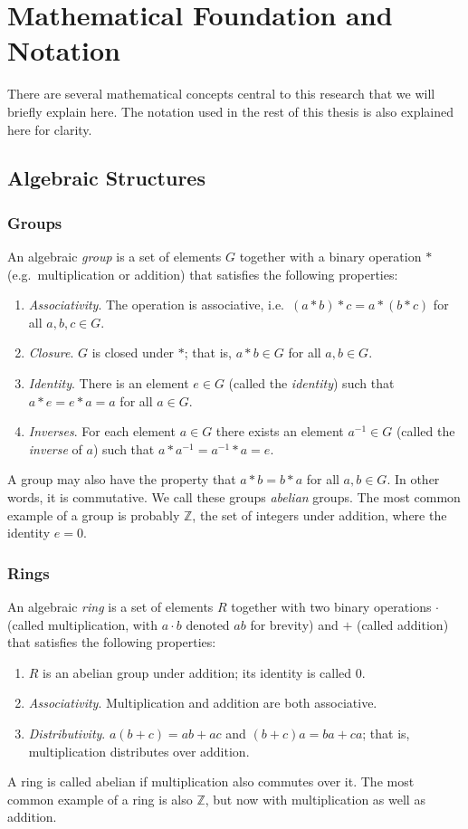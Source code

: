 \chapter{Mathematical Foundation and Notation}
\label{ch:Math}
There are several mathematical concepts central to this research that we will briefly explain here.
The notation used in the rest of this thesis is also explained here for clarity.

\section{Algebraic Structures}
\subsection{Groups}
An algebraic \emph{group} is a set of elements $G$ together with a binary operation $*$ (e.g.\ multiplication or addition) that satisfies the following properties:
\begin{enumerate}
\item \emph{Associativity}. The operation is associative, i.e.\ $(a*b)*c = a*(b*c)$ for all $a, b, c \in G$.
\item \emph{Closure}. $G$ is closed under $*$; that is, $a*b \in G$ for all $a,b \in G$.
\item \emph{Identity}. There is an element $e \in G$ (called the \emph{identity}) such that $a*e = e*a = a$ for all $a \in G$.
\item \emph{Inverses}. For each element $a \in G$ there exists an element $a^{-1} \in G$ (called the \emph{inverse} of $a$) such that $a*a^{-1} = a^{-1}*a = e$.
\end{enumerate}
A group may also have the property that $a*b = b*a$ for all $a, b \in G$.
In other words, it is commutative.
We call these groups \emph{abelian} groups.
The most common example of a group is probably $\mathbb{Z}$, the set of integers under addition, where the identity $e = 0$.

\subsection{Rings}
An algebraic \emph{ring} is a set of elements $R$ together with two binary operations $\cdot$ (called multiplication, with $a \cdot b$ denoted $ab$ for brevity) and $+$ (called addition) that satisfies the following properties:
\begin{enumerate}
\item $R$ is an abelian group under addition; its identity is called $0$.
\item \emph{Associativity}. Multiplication and addition are both associative. 
\item \emph{Distributivity}. $a(b+c) = ab + ac$ and $(b+c)a = ba + ca$; that is, multiplication distributes over addition.
\end{enumerate}
A ring is called abelian if multiplication also commutes over it. 
The most common example of a ring is also $\mathbb{Z}$, but now with multiplication as well as addition.

